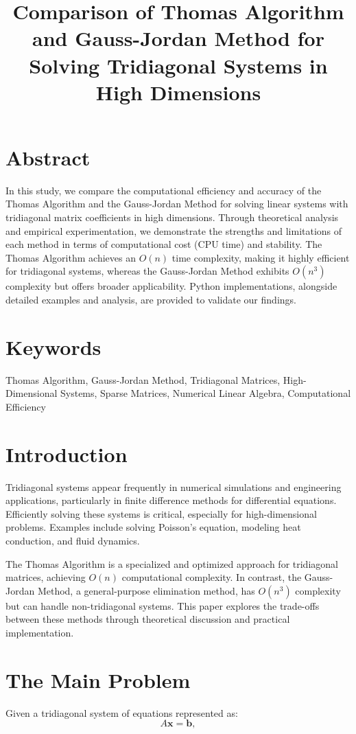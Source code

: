 \documentclass[a4paper,12pt]{article}
\title{Comparison of Thomas Algorithm and Gauss-Jordan Method for Solving Tridiagonal Systems in High Dimensions}
\author{}
\date{}
\begin{document}
\maketitle
\newpage
{}
\setcounter{page}{1}

\section*{Abstract}
In this study, we compare the computational efficiency and accuracy of the Thomas Algorithm and the Gauss-Jordan Method for solving linear systems with tridiagonal matrix coefficients in high dimensions. Through theoretical analysis and empirical experimentation, we demonstrate the strengths and limitations of each method in terms of computational cost (CPU time) and stability. The Thomas Algorithm achieves an \(O(n)\) time complexity, making it highly efficient for tridiagonal systems, whereas the Gauss-Jordan Method exhibits \(O(n^3)\) complexity but offers broader applicability. Python implementations, alongside detailed examples and analysis, are provided to validate our findings.

\section*{Keywords}
Thomas Algorithm, Gauss-Jordan Method, Tridiagonal Matrices, High-Dimensional Systems, Sparse Matrices, Numerical Linear Algebra, Computational Efficiency

\section*{Introduction}
Tridiagonal systems appear frequently in numerical simulations and engineering applications, particularly in finite difference methods for differential equations. Efficiently solving these systems is critical, especially for high-dimensional problems. Examples include solving Poisson's equation, modeling heat conduction, and fluid dynamics.

The Thomas Algorithm is a specialized and optimized approach for tridiagonal matrices, achieving \(O(n)\) computational complexity. In contrast, the Gauss-Jordan Method, a general-purpose elimination method, has \(O(n^3)\) complexity but can handle non-tridiagonal systems. This paper explores the trade-offs between these methods through theoretical discussion and practical implementation.

\newpage
\section*{The Main Problem}
Given a tridiagonal system of equations represented as:
\[
A \mathbf{x} = \mathbf{b},
\]
\end{document}
